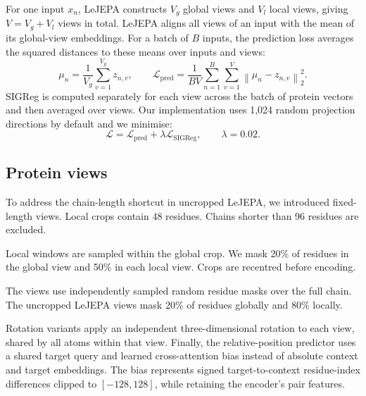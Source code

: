 \documentclass{article}
\begin{document}
For one input $x_n$, LeJEPA constructs $V_g$ global views and $V_l$ local views, giving $V=V_g+V_l$ views in total.
LeJEPA aligns all views of an input with the mean of its global-view embeddings. For a batch of $B$ inputs, the prediction loss averages the squared distances to these means over inputs and views:
\begin{equation}
\mu_n=\frac{1}{V_g}\sum_{v=1}^{V_g}z_{n,v},
\qquad
\mathcal{L}_{\mathrm{pred}}=\frac{1}{BV}\sum_{n=1}^{B}\sum_{v=1}^{V}
\left\|\mu_n-z_{n,v}\right\|_2^2.
\end{equation}
SIGReg is computed separately for each view across the batch of protein vectors and then averaged over views. Our implementation uses 1,024 random projection directions by default and we minimise:
\begin{equation}
\mathcal{L}=\mathcal{L}_{\mathrm{pred}}+\lambda\mathcal{L}_{\mathrm{SIGReg}},
\qquad \lambda=0.02.
\end{equation}

\subsection{Protein views}

To address the chain-length shortcut in uncropped LeJEPA, we introduced fixed-length views. Local crops contain 48 residues. Chains shorter than 96 residues are excluded.

Local windows are sampled within the global crop. We mask 20\% of residues in the global view and 50\% in each local view. Crops are recentred before encoding.

The views use independently sampled random residue masks over the full chain. The uncropped LeJEPA views mask 20\% of residues globally and 80\% locally.

Rotation variants apply an independent three-dimensional rotation to each view, shared by all atoms within that view. Finally, the relative-position predictor uses a shared target query and learned cross-attention bias instead of absolute context and target embeddings. The bias represents signed target-to-context residue-index differences clipped to $[-128,128]$, while retaining the encoder's pair features.
\end{document}
